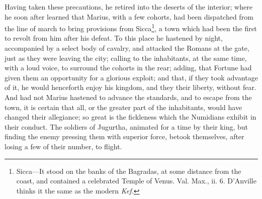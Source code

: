 Having taken these precautions, he retired into the deserts of the
interior; where he soon after learned that Marius, with a few cohorts,
had been dispatched from the line of march to bring provisions from
Sicca\footnote{Sicca—It stood on the banks of the Bagradas, at some distance
from the coast, and contained a celebrated Temple of Venus. Val. Max.,
ii. 6. D'Anville thinks it the same as the modern \emph{Kef.}}, a town which had been the first to revolt from him after
his defeat. To this place he hastened by night, accompanied by a
select body of cavalry, and attacked the Romans at the gate, just as
they were leaving the city; calling to the inhabitants, at the same
time, with a loud voice, to surround the cohorts in the rear; adding,
that Fortune had given them an opportunity for a glorious exploit; and
that, if they took advantage of it, he would henceforth enjoy his
kingdom, and they their liberty, without fear. And had not Marius
hastened to advance the standards, and to escape from the town, it is
certain that all, or the greater part of the inhabitants, would have
changed their allegiance; so great is the fickleness which the
Numidians exhibit in their conduct. The soldiers of Jugurtha, animated
for a time by their king, but finding the enemy pressing them with
superior force, betook themselves, after losing a few of their number,
to flight.

